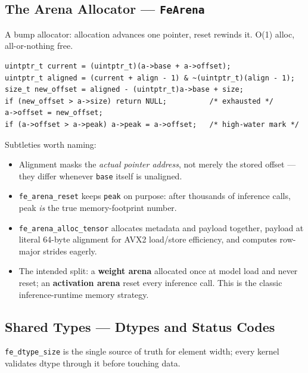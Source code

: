 \documentclass[11pt,a4paper]{article}
\begin{document}
\subsection{The Arena Allocator --- \texttt{FeArena}}

A bump allocator: allocation advances one pointer, reset rewinds it. O(1) alloc,
all-or-nothing free.

\begin{lstlisting}[style=cstyle,caption={core/allocator.c --- alignment happens on the real pointer}]
uintptr_t current = (uintptr_t)(a->base + a->offset);
uintptr_t aligned = (current + align - 1) & ~(uintptr_t)(align - 1);
size_t new_offset = aligned - (uintptr_t)a->base + size;
if (new_offset > a->size) return NULL;          /* exhausted */
a->offset = new_offset;
if (a->offset > a->peak) a->peak = a->offset;   /* high-water mark */
\end{lstlisting}

Subtleties worth naming:

\begin{itemize}[itemsep=2pt]
\item Alignment masks the \emph{actual pointer address}, not merely the stored
      offset --- they differ whenever \texttt{base} itself is unaligned.
\item \texttt{fe\_arena\_reset} keeps \texttt{peak} on purpose: after thousands
      of inference calls, peak \emph{is} the true memory-footprint number.
\item \texttt{fe\_arena\_alloc\_tensor} allocates metadata and payload together,
      payload at literal 64-byte alignment for AVX2 load/store efficiency, and
      computes row-major strides eagerly.
\item The intended split: a \textbf{weight arena} allocated once at model load
      and never reset; an \textbf{activation arena} reset every inference call.
      This is the classic inference-runtime memory strategy.
\end{itemize}

\subsection{Shared Types --- Dtypes and Status Codes}

\texttt{fe\_dtype\_size} is the single source of truth for element width; every
kernel validates dtype through it before touching data.
\end{document}

